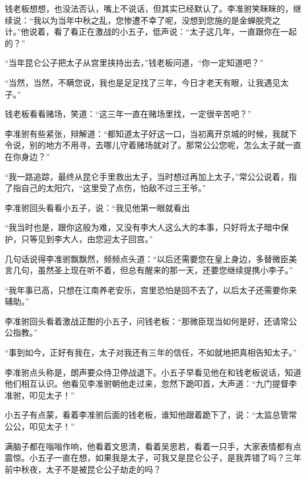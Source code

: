 钱老板想想，也没法否认，嘴上不说话，但其实已经默认了。李准驸笑眯眯的，继续说：“我以为当年中秋之乱，您惨遭不幸了呢，没想到您施的是金蝉脱壳之计。”他说着，看了看正在激战的小五子，低声说：“太子这几年，一直跟你在一起的？”

“当年昆仑公子把太子从宫里挟持出去，”钱老板问道，“你一定知道吧？”

“当然，当然，不瞒您说，我也是足足找了三年，今日才老天有眼，让我遇见太子。”

钱老板看看赌场，笑道：“这三年一直在赌场里找，一定很辛苦吧？”

李准驸有些紧张，辩解道：“都知道太子好这一口，当初离开京城的时候，我就下令说，别的地方不用寻，去哪儿守着赌场就对了。那常公公您呢，怎么太子就一直在你身边？”

“我一路追踪，最终从昆仑手里救出太子，当时想过再加上太子，”常公公说着，指了指自己的太阳穴，“这里受了点伤，怕敌不过三王爷。”

李准驸回头看看小五子，说：“我见他第一眼就看出

“我当时也是，跟你这般为难，又没有李大人这么大的本事，只好将太子暗中保护，只等见到李大人，由您迎太子回宫。”

几句话说得李准驸飘飘然，频频点头道：“以后还需要您在皇上身边，多替微臣美言几句，虽然圣上现在听不着，但总有醒来的那一天，还要您继续提携小李子。”

“我年事已高，只想在江南养老安乐，宫里恐怕是回不去了，以后太子还需要你来辅助。”

李准驸回头看着激战正酣的小五子，问钱老板：“那微臣现当如何是好，还请常公公指教。”

“事到如今，正好有我在，太子对我还有三年的信任，不如就地把真相告知太子。”

李准驸点头称是，朗声要众侍卫停战退下。小五子早看见他在和钱老板说话，知道他们相互认识。他看见李准驸朝他走过来，忽然下跪叩首，大声道：“九门提督李准驸，叩见太子！”

小五子有点蒙，看着李准驸后面的钱老板，谁知他跟着跪下了，说：“太监总管常公公，叩见太子！”

满脑子都在嗡嗡作响，他看着文思清，看着吴思若，看着一只手，大家表情都有点震惊。小五子一直在想，如果我是太子，可我又是昆仑公子，是我弄错了吗？三年前中秋夜，太子不是被昆仑公子劫走的吗？

\newpage